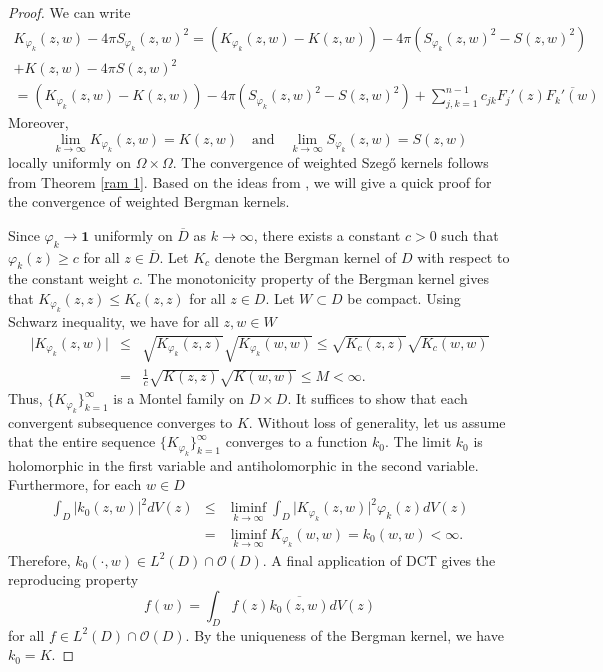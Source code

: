 \documentclass[11pt, reqno]{amsart}
\numberwithin{equation}{section}
\newcommand{\ov}{\overline}
\begin{document}
\begin{proof}
We can write
\begin{multline*}
K_{\varphi_k}(z,w) - 4\pi S_{\varphi_k}(z,w)^2 = (K_{\varphi_k}(z,w) - K(z,w)) - 4\pi (S_{\varphi_k}(z,w)^2 - S(z,w)^2)\\ 
+ K(z,w) - 4\pi S(z,w)^2  \\
=
(K_{\varphi_k}(z,w) - K(z,w)) - 4\pi (S_{\varphi_k}(z,w)^2 - S(z,w)^2)
+ \sum_{j,k=1}^{n-1} c_{jk} F_j'(z) \ov{F_k'(w)} 
\end{multline*}
Moreover, 
\[
\lim_{k\rightarrow\infty}K_{\varphi_k}(z,w) = K(z,w)
\quad \text{and} \quad
\lim_{k\rightarrow\infty}S_{\varphi_k}(z,w) = S(z,w)
\]
locally uniformly on $\Omega\times\Omega$. The convergence of weighted Szeg\H{o} kernels follows from Theorem \ref{ram 1}. Based on the ideas from \cite{ra1, ra2}, we will give a quick proof for the convergence of weighted Bergman kernels. 

\medskip

Since $\varphi_k\rightarrow \mathbf{1}$ uniformly on $\ov D$ as $k\rightarrow\infty$, there exists a constant $c>0$ such that $\varphi_k(z)\geq c$ for all $z\in \ov{D}$. Let $K_c$ denote the Bergman kernel of $D$ with respect to the constant weight $c$. The monotonicity property of the Bergman kernel gives that $K_{\varphi_k}(z,z)\leq K_{c}(z,z)$ for all $z\in D$. 
Let $W\subset D$ be compact. Using Schwarz inequality, we have for all $z,w\in W$
\begin{eqnarray*}
\vert K_{\varphi_k}(z,w)\vert 
&\leq&
\sqrt{K_{\varphi_k}(z,z)} \sqrt{K_{\varphi_k}(w,w)}
\leq
\sqrt{K_{c}(z,z)} \sqrt{K_{c}(w,w)}\\
&=&
\frac{1}{c}\sqrt{K(z,z)} \sqrt{K(w,w)} \leq M <\infty.   
\end{eqnarray*}
Thus, $\{K_{\varphi_k}\}_{k=1}^{\infty}$ is a Montel family on $D\times D$. It suffices to show that each convergent subsequence converges to $K$. Without loss of generality, let us assume that the entire sequence $\{K_{\varphi_k}\}_{k=1}^{\infty}$ converges to a function $k_0$. The limit $k_0$ is holomorphic in the first variable and antiholomorphic in the second variable. Furthermore, for each $w\in D$
\begin{eqnarray*}
\int_{D}\vert k_0(z,w)\vert^2 dV(z) 
&\leq&
\liminf_{k\rightarrow\infty}\int_D \vert K_{\varphi_k}(z,w)\vert^2\varphi_k(z) dV(z) \\
&=&
\liminf_{k\rightarrow\infty}K_{\varphi_k}(w,w) = k_0(w,w)<\infty.
\end{eqnarray*}
Therefore, $k_0(\cdot,w)\in L^2(D)\cap \mathcal{O}(D)$. A final application of DCT gives the reproducing property
\[
f(w) = \int_{D} f(z) \ov{k_0(z,w)}dV(z)
\]
for all $f\in L^2(D)\cap \mathcal{O}(D)$. By the uniqueness of the Bergman kernel, we have $k_0 = K$.
\end{proof}
\end{document}
